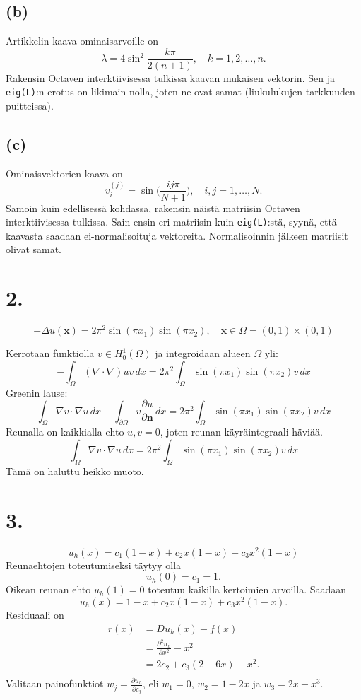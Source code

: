 \documentclass{article}
\begin{document}
\subsection*{(b)}

Artikkelin kaava ominaisarvoille on
\[
  \lambda = 4\sin^2 \frac{k\pi}{2(n+1)}, \quad k = 1,2,\dots,n.
\]
Rakensin Octaven interktiivisessa tulkissa kaavan mukaisen vektorin. Sen ja
\verb#eig(L)#:n erotus on likimain nolla, joten ne ovat samat (liukulukujen
tarkkuuden puitteissa).

\subsection*{(c)}

Ominaisvektorien kaava on
\[
  v_i^{(j)} = \sin \Big(\frac{ij\pi}{N+1}\Big), \quad i,j = 1,\dots,N.
\]
Samoin kuin edellisessä kohdassa, rakensin näistä matriisin Octaven
interktiivisessa tulkissa. Sain ensin eri matriisin kuin \verb#eig(L)#:stä,
syynä, että kaavasta saadaan ei-normalisoituja vektoreita. Normalisoinnin
jälkeen matriisit olivat samat.

\newpage
\section*{2.}

\[
  -\Delta u(\mathbf{x}) = 2\pi^2 \sin(\pi x_1) \sin(\pi x_2),
  \quad \mathbf{x} \in \Omega = (0, 1) \times (0, 1)
\]

Kerrotaan funktiolla $v \in H_0^1(\Omega)$ ja integroidaan alueen $\Omega$ yli:
\[
  -\int_{\Omega} (\nabla \cdot \nabla) u v\,dx
  = 2\pi^2 \int_{\Omega} \sin(\pi x_1) \sin(\pi x_2)v\,dx
\]
Greenin lause:
\[
  \int_{\Omega} \nabla v \cdot \nabla u \,dx
  - \int_{\partial \Omega} v\frac{\partial u}{\partial \mathbf{n}} \,dx
  = 2\pi^2 \int_{\Omega} \sin(\pi x_1) \sin(\pi x_2)v\,dx
\]
Reunalla on kaikkialla ehto $u,v = 0$, joten reunan käyräintegraali häviää.
\[
  \int_{\Omega} \nabla v \cdot \nabla u \,dx
  = 2\pi^2 \int_{\Omega} \sin(\pi x_1) \sin(\pi x_2)v\,dx
\]
Tämä on haluttu heikko muoto.

\newpage
\section*{3.}

\[
  u_h(x) = c_1(1-x) + c_2x(1-x) + c_3x^2(1-x)
\]
Reunaehtojen toteutumiseksi täytyy olla
\[
  u_h(0) = c_1 = 1.
\]
Oikean reunan ehto $u_h(1) = 0$ toteutuu kaikilla kertoimien arvoilla.
Saadaan
\[
  u_h(x) = 1 - x + c_2x(1-x) + c_3x^2(1-x).
\]
Residuaali on
\begin{align*}
  r(x) &= Du_h(x) - f(x) \\
       &= \frac{\partial^2 u_h}{\partial x^2} - x^2 \\
       &= 2c_2 + c_3(2 - 6x) - x^2. \\
\end{align*}
Valitaan painofunktiot $w_j = \frac{\partial u_h}{\partial c_j}$,
eli $w_1 = 0$, $w_2 = 1 - 2x$ ja $w_3 = 2x - x^3$.
\end{document}

